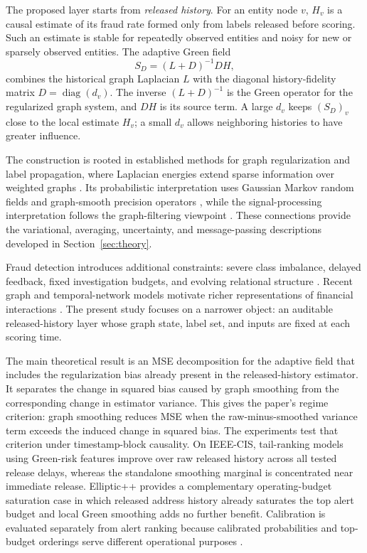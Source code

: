 \documentclass[11pt]{article}
\theoremstyle{definition}
\theoremstyle{remark}
\newcommand{\diag}{\operatorname{diag}}
\begin{document}
The proposed layer starts from \emph{released history}. For an entity node $v$, $H_v$ is a causal estimate of its fraud rate formed only from labels released before scoring. Such an estimate is stable for repeatedly observed entities and noisy for new or sparsely observed entities. The adaptive Green field
\begin{equation}
        S_D=(L+D)^{-1}DH,
        \label{eq:main-field}
\end{equation}
combines the historical graph Laplacian $L$ with the diagonal history-fidelity matrix $D=\diag(d_v)$. The inverse $(L+D)^{-1}$ is the Green operator for the regularized graph system, and $DH$ is its source term. A large $d_v$ keeps $(S_D)_v$ close to the local estimate $H_v$; a small $d_v$ allows neighboring histories to have greater influence.

The construction is rooted in established methods for graph regularization and label propagation, where Laplacian energies extend sparse information over weighted graphs \cite{zhu2003,zhou2004,belkin2006,smola2003,chapelle2006}. Its probabilistic interpretation uses Gaussian Markov random fields and graph-smooth precision operators \cite{rueheld,chung1997,rasmussen2006}, while the signal-processing interpretation follows the graph-filtering viewpoint \cite{shuman2013,ortega2018}. These connections provide the variational, averaging, uncertainty, and message-passing descriptions developed in Section~\ref{sec:theory}.

Fraud detection introduces additional constraints: severe class imbalance, delayed feedback, fixed investigation budgets, and evolving relational structure \cite{boltonhand2002,phua2010,davis2006relationship,saito2015precision,akoglu2015,ranshous2015}. Recent graph and temporal-network models motivate richer representations of financial interactions \cite{weber2019,elmougy2023,kipf2017,hamilton2017,velickovic2018,pareja2020,sankar2020,xu2020,rossi2020}. The present study focuses on a narrower object: an auditable released-history layer whose graph state, label set, and inputs are fixed at each scoring time.

The main theoretical result is an MSE decomposition for the adaptive field that includes the regularization bias already present in the released-history estimator. It separates the change in squared bias caused by graph smoothing from the corresponding change in estimator variance. This gives the paper's regime criterion: graph smoothing reduces MSE when the raw-minus-smoothed variance term exceeds the induced change in squared bias. The experiments test that criterion under timestamp-block causality. On IEEE-CIS, tail-ranking models using Green-risk features improve over raw released history across all tested release delays, whereas the standalone smoothing marginal is concentrated near immediate release. Elliptic++ provides a complementary operating-budget saturation case in which released address history already saturates the top alert budget and local Green smoothing adds no further benefit. Calibration is evaluated separately from alert ranking because calibrated probabilities and top-budget orderings serve different operational purposes \cite{zadrozny2002,niculescu2005,guo2017}.
\end{document}
